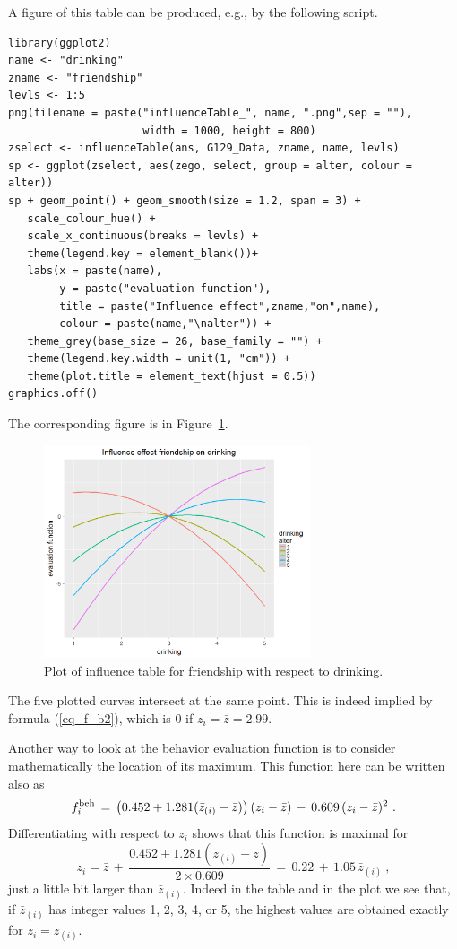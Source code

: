 \documentclass[a4paper,fleqn,11pt]{article}
\newcommand{\+}{\, + \,}
\begin{document}
A figure of this table can be produced, e.g., by the following script.
\begin{verbatim}
library(ggplot2)
name <- "drinking"
zname <- "friendship"
levls <- 1:5
png(filename = paste("influenceTable_", name, ".png",sep = ""),
					 width = 1000, height = 800)
zselect <- influenceTable(ans, G129_Data, zname, name, levls)
sp <- ggplot(zselect, aes(zego, select, group = alter, colour = alter))
sp + geom_point() + geom_smooth(size = 1.2, span = 3) +
   scale_colour_hue() +
   scale_x_continuous(breaks = levls) +
   theme(legend.key = element_blank())+
   labs(x = paste(name),
        y = paste("evaluation function"),
        title = paste("Influence effect",zname,"on",name),
        colour = paste(name,"\nalter")) +
   theme_grey(base_size = 26, base_family = "") +
   theme(legend.key.width = unit(1, "cm")) +
   theme(plot.title = element_text(hjust = 0.5))
graphics.off()
\end{verbatim}

The corresponding figure is in Figure~\ref{F_infl_dk}.

\begin{figure}[hb]
  \centering
  \includegraphics[width=0.7\textwidth]{influenceTable_drinking.png}
  \caption{Plot of influence table  for friendship with respect to drinking.}
  \label{F_infl_dk}
\end{figure}

\noindent
The five plotted curves intersect at the same point. This is indeed implied
by  formula (\ref{eq_f_b2}), which is 0 if $z_i = \bar z = 2.99$.


Another way to look at the behavior evaluation function is to consider
mathematically the location of its maximum.
This function here can be written also as
\[
   f^{\rm beh}_i \,=\, \big( 0.452 +
                1.281( \bar z_{(i)} - \bar z) \big) \, (z_i - \bar z)
       \,-\, 0.609 \, (z_i - \bar z)^2   \ .
\]
Differentiating with respect to $z_i$ shows that
this function is maximal for
\[
   z_i = \bar z \,+\, \frac{0.452 +
               1.281( \bar z_{(i)} - \bar z)}{2 \times  0.609 }
    \,=\,  0.22 \,+\, 1.05 \,  \bar z_{(i)}  \ ,
\]
just a little bit larger than $ \bar z_{(i)}$.
Indeed in the table and in the plot we see that, if $ \bar z_{(i)}$
has integer values 1, 2, 3, 4, or 5,
the highest values are obtained exactly
for  $z_i = \bar z_{(i)}$.
\end{document}
